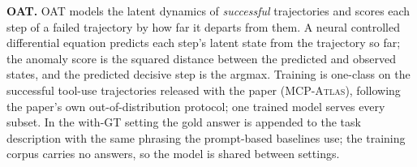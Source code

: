 \textbf{OAT.}
OAT models the latent dynamics of \emph{successful} trajectories and scores each step of a failed trajectory by how far it departs from them. A neural controlled differential equation predicts each step's latent state from the trajectory so far; the anomaly score is the squared distance between the predicted and observed states, and the predicted decisive step is the argmax.
Training is one-class on the successful tool-use trajectories released with the paper (\textsc{MCP-Atlas}), following the paper's own out-of-distribution protocol; one trained model serves every subset.
In the with-GT setting the gold answer is appended to the task description with the same phrasing the prompt-based baselines use; the training corpus carries no answers, so the model is shared between settings.

